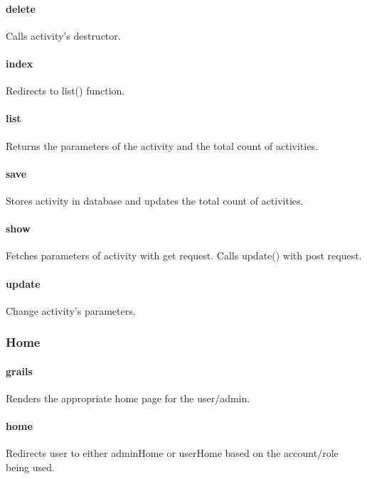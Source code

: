 \documentclass[12pt]{article}
\begin{document}
\paragraph{delete} Calls activity's destructor.
\paragraph{index} Redirects to list() function.
\paragraph{list} Returns the parameters of the activity and the total count of activities.
\paragraph{save} Stores activity in database and updates the total count of activities.
\paragraph{show} Fetches parameters of activity with get request. Calls update() with post request.
\paragraph{update} Change activity's parameters.

\subsubsection{Home}\label{sec:CHome}
\paragraph{grails} Renders the appropriate home page for the user/admin.
\paragraph{home} Redirects user to either adminHome or userHome based on the account/role being used.
\end{document}
